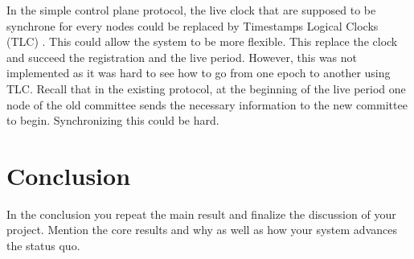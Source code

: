 \documentclass[a4paper,11pt,oneside]{report}
\begin{document}
In the simple control plane protocol, the live clock that are supposed to be
synchrone for every nodes could be replaced by Timestamps Logical Clocks (TLC)
\cite{Que-Sera-Consensus}. This could allow the system to be more flexible.
This replace the clock and succeed the registration and the live period.
However, this was not implemented as it was hard to see how to go from one
epoch to another using TLC. Recall that in the existing protocol, at the
beginning of the live period one node of the old committee sends the necessary
information to the new committee to begin. Synchronizing this could be hard.

\chapter{Conclusion}

In the conclusion you repeat the main result and finalize the discussion of
your project. Mention the core results and why as well as how your system
advances the status quo.

\cleardoublepage {} {}
\printbibliography

%
%
\end{document}
